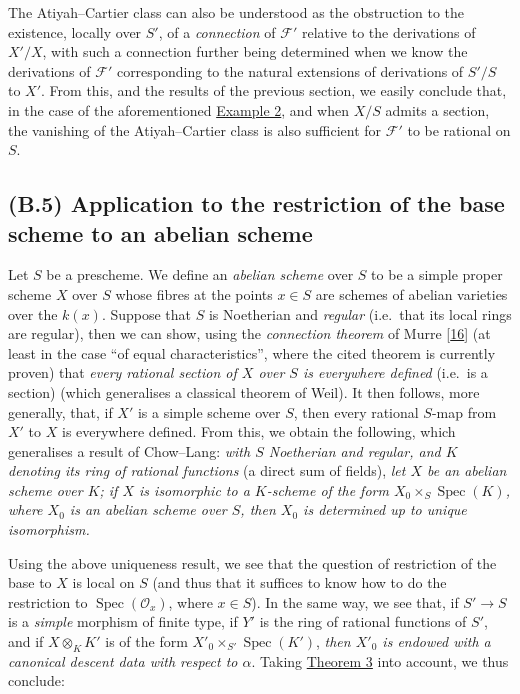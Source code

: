 \documentclass{article}
\newcommand{\oldpage}[1]{\marginpar{\footnotesize$\Big\vert$ \textit{p.~#1}}}
\theoremstyle{definition}
\theoremstyle{definition}
\theoremstyle{definition}
\theoremstyle{definition}
\theoremstyle{remark}
\begin{document}
The Atiyah--Cartier class can also be understood as the obstruction to the existence, locally over \(S'\), of a \emph{connection} of \({\mathcal{F}}'\) relative to the derivations of \(X'/X\), with such a connection further being determined when we know the derivations of \({\mathcal{F}}'\) corresponding to the natural extensions of derivations of \(S'/S\) to \(X'\).
From this, and the results of the previous section, we easily conclude that, in the case of the aforementioned \protect\hyperlink{fga-3-i-section-B.3-example-1}{Example 2}, and when \(X/S\) admits a section, the vanishing of the Atiyah--Cartier class is also sufficient for \({\mathcal{F}}'\) to be rational on \(S\).

\hypertarget{fga-3-i-section-B.5}{%
\subsection{(B.5) Application to the restriction of the base scheme to an abelian scheme}\label{fga-3-i-section-B.5}}

Let \(S\) be a prescheme.
\oldpage{190-26}We define an \emph{abelian scheme} over \(S\) to be a simple proper scheme \(X\) over \(S\) whose fibres at the points \(x\in S\) are schemes of abelian varieties over the \(k(x)\).
Suppose that \(S\) is Noetherian and \emph{regular} (i.e.~that its local rings are regular), then we can show, using the \emph{connection theorem} of Murre {[}\protect\hyperlink{ref-Mur1958}{16}{]}
(at least in the case ``of equal characteristics'', where the cited theorem is currently proven) that \emph{every rational section of \(X\) over \(S\) is everywhere defined} (i.e.~is a section) (which generalises a classical theorem of Weil).
It then follows, more generally, that, if \(X'\) is a simple scheme over \(S\), then every rational \(S\)-map from \(X'\) to \(X\) is everywhere defined.
From this, we obtain the following, which generalises a result of Chow--Lang:
\emph{with \(S\) Noetherian and regular, and \(K\) denoting its ring of rational functions} (a direct sum of fields), \emph{let \(X\) be an abelian scheme over \(K\); if \(X\) is isomorphic to a \(K\)-scheme of the form \(X_0\times_S\operatorname{Spec}(K)\), where \(X_0\) is an abelian scheme over \(S\), then \(X_0\) is determined up to unique isomorphism.}

Using the above uniqueness result, we see that the question of restriction of the base to \(X\) is local on \(S\) (and thus that it suffices to know how to do the restriction to \(\operatorname{Spec}({\mathscr{O}}_x)\), where \(x\in S\)).
In the same way, we see that, if \(S'\to S\) is a \emph{simple} morphism of finite type, if \(Y'\) is the ring of rational functions of \(S'\), and if \(X\otimes_K K'\) is of the form \(X'_0\times_{S'}\operatorname{Spec}(K')\), \emph{then \(X'_0\) is endowed with a canonical descent data with respect to \(\alpha\)}.
Taking \protect\hyperlink{fga-3-i-section-B.1-theorem-3}{Theorem 3} into account, we thus conclude:
\end{document}
